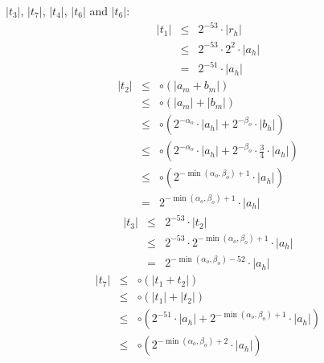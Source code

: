 \documentclass[a4paper,10pt,twoside]{article}
\newenvironment{proof}[1][Proof]{\begin{trivlist}
\item[\hskip \labelsep {\bfseries #1}]}{\end{trivlist}}
\newcommand{\hi}{\ensuremath{\mathit{h}}}
\newcommand{\mi}{\ensuremath{\mathit{m}}}
\begin{document}
\begin{proof}
$\left \vert t_3 \right \vert$, $\left \vert t_7 \right \vert$, $\left \vert
  t_4 \right \vert$, $\left \vert t_6 \right \vert$ and $\left \vert t_6 \right \vert$:
\begin{eqnarray*}
\left \vert t_1 \right \vert & \leq & 2^{-53} \cdot \left \vert r_\hi \right \vert \\
& \leq & 2^{-53} \cdot 2^2 \cdot \left \vert a_\hi \right \vert \\
& = & 2^{-51} \cdot \left \vert a_\hi \right \vert
\end{eqnarray*}
\begin{eqnarray*}
\left \vert t_2 \right \vert & \leq & \circ \left( \left \vert a_\mi + b_\mi \right \vert \right)  \\
& \leq & \circ \left( \left \vert a_\mi \right \vert + \left \vert b_\mi \right \vert \right) \\
& \leq & \circ \left( 2^{-\alpha_o} \cdot \left \vert a_\hi \right \vert + 2^{-\beta_o} \cdot \left \vert b_\hi \right \vert \right) \\
& \leq & \circ \left( 2^{-\alpha_o} \cdot \left \vert a_\hi \right \vert + 2^{-\beta_o} \cdot \frac{3}{4} \cdot \left \vert a_\hi \right \vert \right) \\
& \leq & \circ \left( 2^{-\min\left(\alpha_o,\beta_o\right) + 1} \cdot \left \vert a_\hi \right \vert \right) \\
& = & 2^{-\min\left(\alpha_o,\beta_o\right) + 1} \cdot \left \vert a_\hi \right \vert
\end{eqnarray*}
\begin{eqnarray*}
\left \vert t_3 \right \vert & \leq & 2^{-53} \cdot \left \vert t_2 \right \vert \\
& \leq & 2^{-53} \cdot 2^{-\min\left(\alpha_o,\beta_o\right) + 1} \cdot \left \vert a_\hi \right \vert \\
& = & 2^{-\min\left(\alpha_o,\beta_o\right)-52} \cdot \left \vert a_\hi \right \vert
\end{eqnarray*}
\begin{eqnarray*}
\left \vert t_7 \right \vert & \leq & \circ \left( \left \vert t_1 + t_2 \right \vert \right) \\
& \leq & \circ \left( \left \vert t_1 \right \vert + \left \vert t_2 \right \vert \right) \\
& \leq & \circ \left( 2^{-51} \cdot \left \vert a_\hi \right \vert + 2^{-\min\left(\alpha_o,\beta_o\right) + 1}
\cdot \left \vert a_\hi \right \vert \right) \\
& \leq & \circ \left( 2^{-\min\left(\alpha_o,\beta_o\right) + 2} \cdot \left \vert a_\hi \right \vert \right) \\

\end{eqnarray*}
\end{proof}
\end{document}
